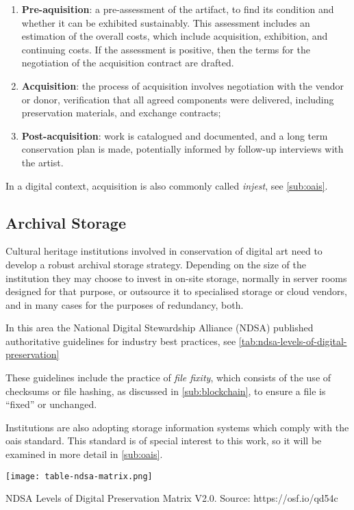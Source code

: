 \begin{enumerate}
    \item \textbf{Pre-aquisition}: a pre-assessment of the artifact, to find its condition and whether it can be exhibited sustainably. This assessment includes an estimation of the overall costs, which include acquisition, exhibition, and continuing costs. If the assessment is positive, then the terms for the negotiation of the acquisition contract are drafted.
    \item  \textbf{Acquisition}: the process of acquisition involves negotiation with the vendor or donor, verification that all agreed components were delivered, including preservation materials, and exchange contracts;
    \item  \textbf{Post-acquisition}: work is catalogued and documented, and a long term conservation plan is made, potentially informed by follow-up interviews with the artist.
\end{enumerate}

In a digital context, acquisition is also commonly called \emph{injest}, see \autoref{sub:oais}.

\subsection{Archival Storage}

Cultural heritage institutions involved in conservation of digital art need to develop a robust archival storage strategy. Depending on the size of the institution they may choose to invest in on-site storage, normally in server rooms designed for that purpose, or outsource it to specialised storage or cloud vendors, and in many cases for the purposes of redundancy, both.

In this area the National Digital Stewardship Alliance (NDSA) published authoritative guidelines for industry best practices, see \autoref{tab:ndsa-levels-of-digital-preservation}

These guidelines include the practice of \emph{file fixity}, which consists of the use of checksums or file hashing, as discussed in \autoref{sub:blockchain}, to ensure a file is ``fixed'' or unchanged.

Institutions are also adopting storage information systems which comply with the \gls{oais} standard. This standard is of special interest to this work, so it will be examined in more detail in \autoref{sub:oais}.

\begin{table}[h!]
\centering
\captionsetup{type=table} %
\texttt{[image: table-ndsa-matrix.png]} %
\caption[NDSA Levels of Digital Preservation Matrix V2.0]{NDSA Levels of Digital Preservation Matrix V2.0. Source: https://osf.io/qd54c}
\label{tab:ndsa-levels-of-digital-preservation}
\end{table}


